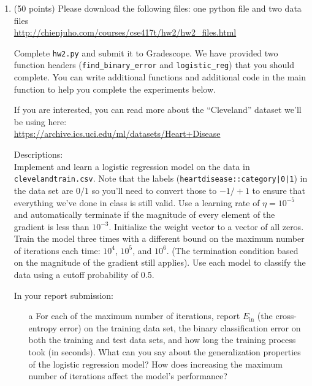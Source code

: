 \documentclass[11pt]{article}
\begin{document}
\begin{enumerate}
\item (50 points) 
    Please download the following files: one python file and two data files\\
    \url{http://chienjuho.com/courses/cse417t/hw2/hw2_files.html}


  Complete \texttt{hw2.py} and submit it to Gradescope. 
  We have provided two function headers (\texttt{find\_binary\_error} and \texttt{logistic\_reg}) that you should complete.
  You can write additional functions and additional code in the main function to help you complete the experiments below.
  
  If you are interested, you can read more about the ``Cleveland'' dataset we'll be using here:\\
    \url{https://archive.ics.uci.edu/ml/datasets/Heart+Disease}

  Descriptions:\\
  Implement and learn a logistic regression model on the data in \texttt{clevelandtrain.csv}.
  Note that the labels (\texttt{heartdisease::category|0|1}) in the data set are $0/1$ so you'll need to convert those to $-1/+1$ to ensure that everything
  we've done in class is still valid. 
  Use a learning rate of $\eta = 10^{-5}$ and automatically terminate if the magnitude of every element of the gradient is less than $10^{-3}$.
  Initialize the weight vector to a vector of all zeros. 
  Train the model three times with a different bound on the maximum number of iterations each time: $10^4$, $10^5$, and $10^6$.
   (The termination condition based on the magnitude of the gradient still applies). 
   Use each model to classify the data using a cutoff probability of 0.5.
    
   In your report submission:
   \begin{itemize}
    \item[a]
    For each of the maximum number of iterations, 
    report $E_{\text{in}}$ (the cross-entropy error) on the training data set, the binary classification error on
    both the training and test data sets, and how long the training process took (in seconds).
    What can you say about the generalization properties of the logistic regression model? 
    How does increasing the maximum number of iterations affect the model's performance?



\end{itemize}
\end{enumerate}
\end{document}
